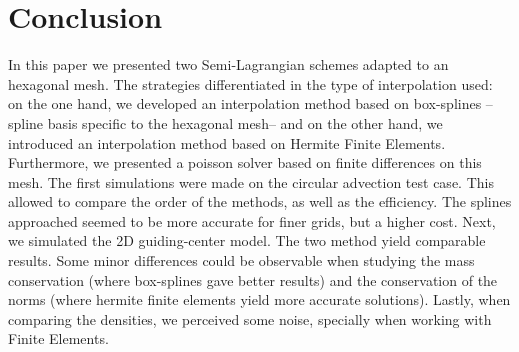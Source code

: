 \documentclass[proc]{edpsmath}
\begin{document}
\section{Conclusion}
\label{sec:conclusion}
In this paper we presented two Semi-Lagrangian schemes adapted to an hexagonal mesh. The strategies differentiated in the type of interpolation used: on the one hand, we developed an interpolation method based on box-splines --spline basis specific to the hexagonal mesh-- and on the other hand, we introduced an interpolation method based on Hermite Finite Elements. Furthermore, we presented a poisson solver based on finite differences on this mesh. The first simulations were made on the circular advection test case. This allowed to compare the order of the methods, as well as the efficiency. The splines approached seemed to be more accurate for finer grids, but a higher cost. Next, we simulated the 2D guiding-center model. The two method yield comparable results. Some minor differences could be observable when studying the mass conservation (where box-splines gave better results) and the conservation of the norms (where hermite finite elements yield more accurate solutions). Lastly, when comparing the densities, we perceived some noise, specially when working with Finite Elements.




\end{document}
